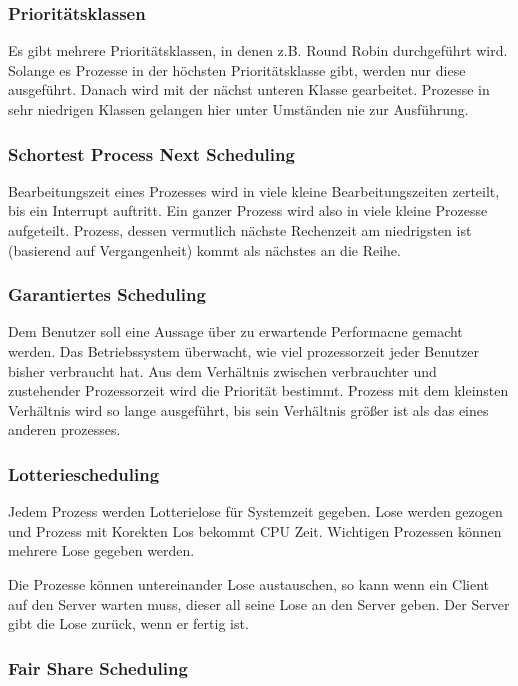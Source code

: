 \subsubsection*{Prioritätsklassen}

Es gibt mehrere Prioritätsklassen, in denen z.B. Round Robin durchgeführt wird.
Solange es Prozesse in der höchsten Prioritätsklasse gibt, werden nur diese
ausgeführt. Danach wird mit der nächst unteren Klasse gearbeitet. Prozesse in
sehr niedrigen Klassen gelangen hier unter Umständen nie zur Ausführung.

\subsubsection{Schortest Process Next Scheduling}

Bearbeitungszeit eines Prozesses wird in viele kleine Bearbeitungszeiten
zerteilt, bis ein Interrupt auftritt. Ein ganzer Prozess wird also in viele
kleine Prozesse aufgeteilt. Prozess, dessen vermutlich nächste Rechenzeit am
niedrigsten ist (basierend auf Vergangenheit) kommt als nächstes an die Reihe.

\subsubsection{Garantiertes Scheduling}

Dem Benutzer soll eine Aussage über zu erwartende Performacne gemacht werden.
Das Betriebssystem überwacht, wie viel prozessorzeit jeder Benutzer bisher
verbraucht hat. Aus dem Verhältnis zwischen verbrauchter und zustehender
Prozessorzeit wird die Priorität bestimmt. Prozess mit dem kleinsten Verhältnis
wird so lange ausgeführt, bis sein Verhältnis größer ist als das eines anderen
prozesses.

\subsubsection{Lotteriescheduling}

Jedem Prozess werden Lotterielose für Systemzeit gegeben. Lose werden gezogen
und Prozess mit Korekten Los bekommt CPU Zeit. Wichtigen Prozessen können
mehrere Lose gegeben werden.

Die Prozesse können untereinander Lose austauschen, so kann wenn ein Client auf
den Server warten muss, dieser all seine Lose an den Server geben. Der Server
gibt die Lose zurück, wenn er fertig ist.

\subsubsection{Fair Share Scheduling}

